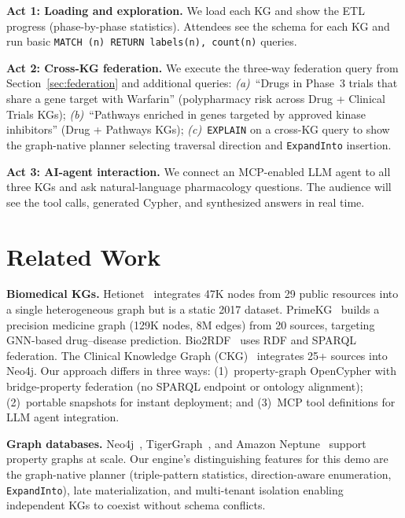\documentclass[sigconf, anonymous, review]{acmart}
\begin{document}
\smallskip\noindent\textbf{Act 1: Loading and exploration.}
We load each KG and show the ETL progress (phase-by-phase
statistics).  Attendees see the schema for each KG and run
basic \texttt{MATCH (n) RETURN labels(n), count(n)} queries.

\smallskip\noindent\textbf{Act 2: Cross-KG federation.}
We execute the three-way federation query from
Section~\ref{sec:federation} and additional queries:
\emph{(a)}~``Drugs in Phase~3 trials that share a gene target
with Warfarin'' (polypharmacy risk across Drug + Clinical Trials KGs);
\emph{(b)}~``Pathways enriched in genes targeted by approved
kinase inhibitors'' (Drug + Pathways KGs);
\emph{(c)}~\texttt{EXPLAIN} on a cross-KG query to show the
graph-native planner selecting traversal direction and
\texttt{ExpandInto} insertion.

\smallskip\noindent\textbf{Act 3: AI-agent interaction.}
We connect an MCP-enabled LLM agent to all three KGs and ask
natural-language pharmacology questions.  The audience will see
the tool calls, generated Cypher, and synthesized answers in
real time.

\section{Related Work}\label{sec:related}

\textbf{Biomedical KGs.}  Hetionet~\cite{himmelstein2017hetionet}
integrates 47K nodes from 29 public resources into a single
heterogeneous graph but is a static 2017 dataset.
PrimeKG~\cite{chandak2023primekg} builds a precision medicine
graph (129K nodes, 8M edges) from 20 sources, targeting GNN-based
drug--disease prediction.
Bio2RDF~\cite{callahan2013bio2rdf} uses RDF and SPARQL federation.
The Clinical Knowledge Graph (CKG)~\cite{santos2022ckg} integrates
25+ sources into Neo4j.  Our approach differs in three ways:
(1)~property-graph OpenCypher with bridge-property federation
(no SPARQL endpoint or ontology alignment);
(2)~portable snapshots for instant deployment; and
(3)~MCP tool definitions for LLM agent integration.

\smallskip\noindent\textbf{Graph databases.}
Neo4j~\cite{neo4j}, TigerGraph~\cite{deutsch2019tigergraph},
and Amazon Neptune~\cite{neptune} support property graphs at
scale.  Our engine's distinguishing features for this demo are
the graph-native planner (triple-pattern statistics,
direction-aware enumeration, \texttt{ExpandInto}), late
materialization, and multi-tenant isolation enabling
independent KGs to coexist without schema conflicts.
\end{document}
